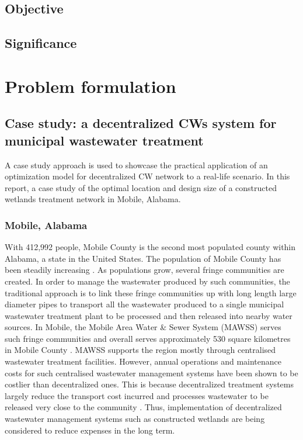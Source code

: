 \documentclass[preprint,12pt,authoryear]{elsarticle}
\begin{document}
\subsection{Objective}

\subsection{Significance}

\section{Problem formulation}\label{section:problem}
\subsection{Case study: a decentralized CWs system for municipal wastewater treatment}
A case study approach is used to showcase the practical application of an optimization model for decentralized CW network to a real-life scenario. In this report, a case study of the optimal location and design size of a constructed wetlands treatment network in Mobile, Alabama.

\subsubsection{Mobile, Alabama}
With 412,992 people, Mobile County is the second most populated county within Alabama, a state in the United States. The population of Mobile County has been steadily increasing \citep{uscb2002census}. As populations grow, several fringe communities are created. In order to manage the wastewater produced by such communities, the traditional approach is to link these fringe communities up with long length large diameter pipes to transport all the wastewater produced to a single municipal wastewater treatment plant to be processed and then released into nearby water sources. In Mobile, the Mobile Area Water \& Sewer System (MAWSS) serves such fringe communities and overall serves approximately 530 square kilometres in Mobile County \citep{mawss2015}. MAWSS supports the region mostly through centralised wastewater treatment facilities. However, annual operations and maintenance costs for such centralised wastewater management systems have been shown to be costlier than decentralized ones. This is because decentralized treatment systems largely reduce the transport cost incurred and processes wastewater to be released very close to the community \citep{mawss2015}. Thus, implementation of decentralized wastewater management systems such as constructed wetlands are being considered to reduce expenses in the long term. 
\end{document}
